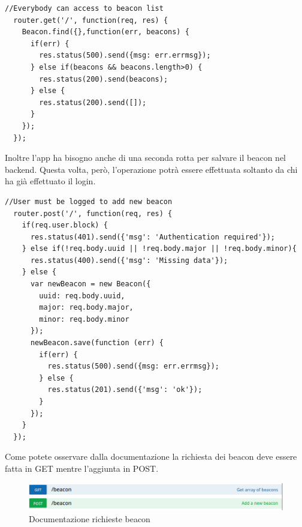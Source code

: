 \begin{lstlisting}[caption={/webserver/app/routes/beacon.js get}, style=javaScriptCode]
  //Everybody can access to beacon list
  router.get('/', function(req, res) {
    Beacon.find({},function(err, beacons) {
      if(err) {
        res.status(500).send({msg: err.errmsg});
      } else if(beacons && beacons.length>0) {
        res.status(200).send(beacons);
      } else {
        res.status(200).send([]);
      }
    });
  });
\end{lstlisting}
Inoltre l'app ha bisogno anche di una seconda rotta per salvare il beacon nel backend.
Questa volta, però, l'operazione potrà essere effettuata soltanto da chi ha già effettuato il login.
\begin{lstlisting}[caption={/webserver/app/routes/beacon.js aggiunta}, style=javaScriptCode]
  //User must be logged to add new beacon
  router.post('/', function(req, res) {
    if(req.user.block) {
      res.status(401).send({'msg': 'Authentication required'});
    } else if(!req.body.uuid || !req.body.major || !req.body.minor){
      res.status(400).send({'msg': 'Missing data'});
    } else {
      var newBeacon = new Beacon({
        uuid: req.body.uuid,
        major: req.body.major,
        minor: req.body.minor
      });
      newBeacon.save(function (err) {
        if(err) {
          res.status(500).send({msg: err.errmsg});
        } else {
          res.status(201).send({'msg': 'ok'});
        }
      });
    }
  });
\end{lstlisting}

Come potete osservare dalla documentazione la richiesta dei beacon deve essere fatta in GET mentre l'aggiunta in POST.

\begin{figure}[h]
\centering
\includegraphics[width=1\textwidth]{API/beacon_03.png} 
\caption{Documentazione richieste beacon}
\label{fig:beacon}
\end{figure}

